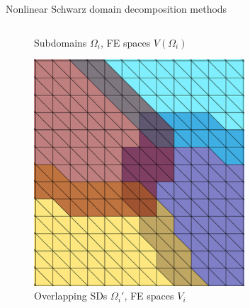 \begin{frame}[noframenumbering]{Nonlinear Schwarz domain decomposition methods}
\begin{columns}
\begin{column}{0.3\textwidth}
\begin{figure}
				\vspace{-2mm}
				\caption{\tiny Subdomains $\Omega_i$, FE spaces $V(\Omega_i)$}
			\end{figure}
			\vspace{-6mm}
			\begin{figure}
				\includegraphics[height=0.4\textwidth,width=0.7\textwidth]{images/DD-mesh-3.png}
				\vspace{-2mm}
				\caption{\tiny Overlapping SDs $\Omega_i'$, FE spaces $V_i$}
			\end{figure}
		\end{column}

	\end{columns}
\end{frame}

